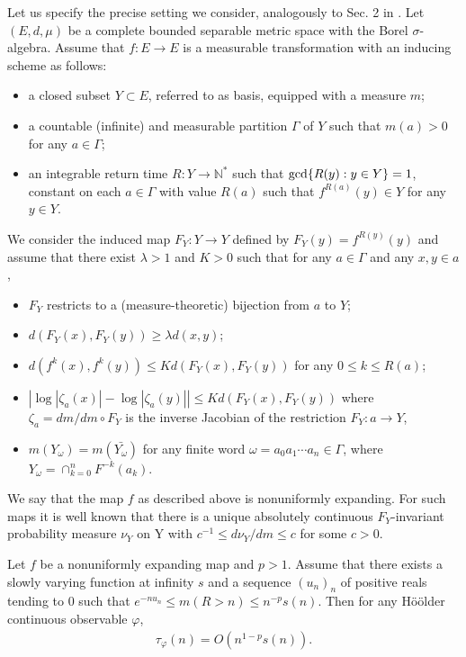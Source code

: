 \documentclass{ws-sd}
\newcommand{\N}{\mathbb{N}}
\newcommand{\abs}[1]{\left\lvert #1 \right\rvert}
\begin{document}
Let us specify the precise setting we consider, analogously to Sec. 2 in \cite{6}. Let $(E,d, \mu)$ be a complete bounded separable metric space with the Borel $\sigma$-algebra. Assume that $f : E \to E$ is a measurable transformation with an inducing scheme as follows:
\begin{itemize}
        \item a closed subset $Y \subset E$, referred to as basis, equipped with a measure $m$;
        \item a countable (infinite) and measurable partition $\Gamma$ of $Y$ such that $m(a) > 0$ for any $a \in \Gamma$;
        \item an integrable return time $R : Y \to \N^*$ such that $  {\rm gcd}\{R(y) : y \in Y\} = 1$, constant on each $a \in \Gamma$ with value $R(a)$ such that $f^{R(a)}(y) \in Y$ for any $y \in Y$.
\end{itemize}
We consider the induced map $F_Y : Y \to Y$ defined by $F_Y(y) = f^{R(y)}(y)$ and assume that there exist $\lambda > 1$ and $K > 0$ such that for any $a \in \Gamma$ and any $x,y \in a$,
\begin{itemize}
        \item $F_Y$ restricts to a (measure-theoretic) bijection from $a$ to $Y$;
        \item $d(F_Y (x), F_Y (y)) \ge \lambda d(x, y)$;
        \item $d(f^k(x), f^k(y)) \le  Kd(F_Y (x), F_Y (y))$ for any $0 \le k \le R(a)$;
        \item $\abs{\log |\zeta_a(x)| - \log |\zeta_a(y)| } \le  Kd(F_Y (x), F_Y (y))$ where $\zeta_a = dm/ dm\circ F_Y$ is the inverse Jacobian of the restriction $F_Y : a \to Y$,
        \item $m(Y_\omega) = m(\bar{Y_\omega})$ for any finite word $\omega = a_0 a_1 \cdots a_n \in \Gamma$, where\\ $Y_\omega = \cap_{k = 0}^n F^{-k}(a_k)$.
\end{itemize}
We say that the map $f$ as described above is nonuniformly expanding.
For such maps it is well known that there is a unique absolutely continuous $F_Y$-invariant probability measure $\nu_Y$ on Y with $c^{-1} \le d\nu_Y/dm \le c$ for some $c > 0$.

\begin{proposition}
        \label{Proposition:estim_tau_weakmoment}
    Let $f$ be a nonuniformly expanding map and $p >1$. Assume that there exists a slowly varying function at infinity $s$ and a sequence $(u_n)_n$ of positive reals tending to 0 such that $e^{-nu_n} \le m(R>n) \le n^{-p}s(n)$. Then for any Hö\"older continuous observable $\varphi$,
    \begin{align}
        \label{estim_tau_weakmoment}
        \tau_{\varphi}(n) = O(n^{1-p}s(n)).
    \end{align}
\end{proposition}
\end{document}
